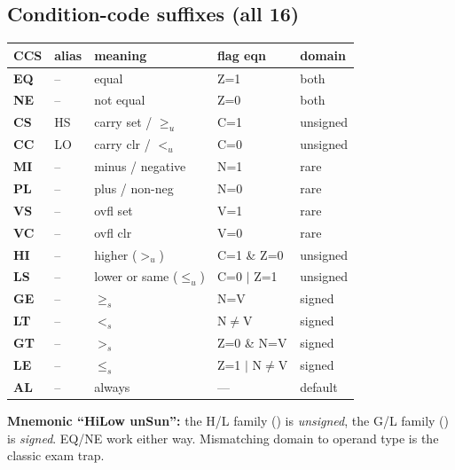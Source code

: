 \subsection{Condition-code suffixes (all 16)}
\begin{center}\scriptsize
\begin{tabular}{@{}lllll@{}}
\toprule
CCS & alias & meaning & flag eqn & domain \\
\midrule
\textbf{EQ} & --   & equal           & Z=1            & both \\
\textbf{NE} & --   & not equal       & Z=0            & both \\
\textbf{CS} & HS   & carry set / $\geq_u$ & C=1       & unsigned \\
\textbf{CC} & LO   & carry clr / $<_u$    & C=0       & unsigned \\
\textbf{MI} & --   & minus / negative& N=1            & rare \\
\textbf{PL} & --   & plus / non-neg  & N=0            & rare \\
\textbf{VS} & --   & ovfl set        & V=1            & rare \\
\textbf{VC} & --   & ovfl clr        & V=0            & rare \\
\textbf{HI} & --   & higher ($>_u$)  & C=1 \& Z=0     & unsigned \\
\textbf{LS} & --   & lower or same ($\leq_u$) & C=0 $\vert$ Z=1 & unsigned \\
\textbf{GE} & --   & $\geq_s$        & N=V            & signed \\
\textbf{LT} & --   & $<_s$           & N$\neq$V       & signed \\
\textbf{GT} & --   & $>_s$           & Z=0 \& N=V     & signed \\
\textbf{LE} & --   & $\leq_s$        & Z=1 $\vert$ N$\neq$V & signed \\
\textbf{AL} & --   & always          & ---            & default \\
\bottomrule
\end{tabular}
\end{center}
\textbf{Mnemonic ``HiLow unSun'':} the H/L family () is \emph{unsigned}, the G/L family () is \emph{signed}. EQ/NE work either way. Mismatching domain to operand type is the classic exam trap.

